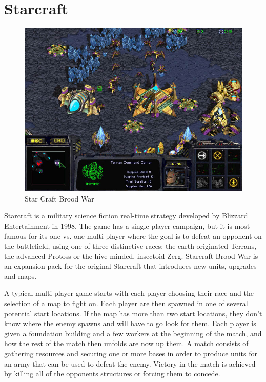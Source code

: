 
\section{Starcraft}
\label{sec:starcrafttheory}
\begin{figure}[h!tb]
\centering
\includegraphics[scale=0.5]{graphics/scbw.jpg}
\caption{Star Craft Brood War}
\label{fig:scbwIntro}
\end{figure}

Starcraft is a military science fiction real-time strategy developed by Blizzard
Entertainment in 1998.\cite{starcraft} The game has a single-player campaign,
but it is most famous for its one vs. one multi-player where the goal is to
defeat an opponent on the battlefield, using one of three distinctive races;
the earth-originated Terrans, the advanced Protoss or the hive-minded,
insectoid Zerg. Starcraft Brood War is an expansion pack for the original
Starcraft that introduces new units, upgrades and maps. 

A typical multi-player game starts with each player choosing their race and the
selection of a map to fight on. Each player are then spawned in one of
several potential start locations. If the map has more than two start
locations, they don't know where the enemy spawns and will have to go look for
them. Each player is given a foundation building and a few workers at the
beginning of the match, and how the rest of the match then unfolds are now up
them. A match consists of gathering resources and securing one or more bases in
order to produce units for an army that can be used to defeat the enemy. Victory
in the match is achieved by killing all of the opponents structures or forcing
them to concede.

